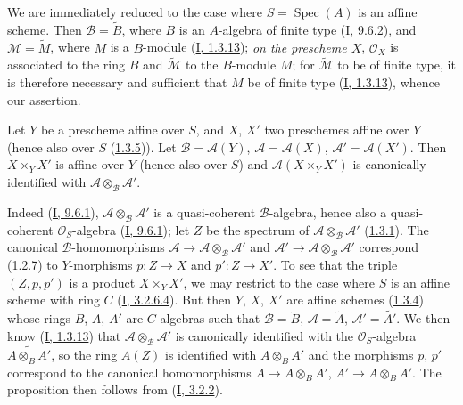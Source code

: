 We are immediately reduced to the case where $S=\operatorname{Spec}(A)$ is
an affine scheme. Then $\mathcal{B}=\widetilde{B}$, where $B$ is an
$A$-algebra of finite type (\hyperref[I.9.6.2]{I, 9.6.2}), and
$\mathcal{M}=\widetilde{M}$, where $M$ is a $B$-module
(\hyperref[I.1.3.13]{I, 1.3.13}); \emph{on the prescheme $X$},
$\mathcal{O}_X$ is associated to the ring $B$ and
$\widetilde{\mathcal{M}}$ to the $B$-module $M$; for
$\widetilde{\mathcal{M}}$ to be of finite type, it is therefore necessary
and sufficient that $M$ be of finite type
(\hyperref[I.1.3.13]{I, 1.3.13}), whence our assertion.

\begin{proposition}[1.4.6]
\label{II.1.4.6}
Let $Y$ be a prescheme affine over $S$, and $X$, $X'$ two preschemes
affine over $Y$ (hence also over $S$
(\hyperref[II.1.3.5]{1.3.5})). Let
$\mathcal{B}=\mathcal{A}(Y)$, $\mathcal{A}=\mathcal{A}(X)$,
$\mathcal{A}'=\mathcal{A}(X')$. Then $X\times_Y X'$ is affine over
$Y$ (hence also over $S$) and $\mathcal{A}(X\times_Y X')$
is canonically identified with $\mathcal{A}\otimes_{\mathcal{B}}\mathcal{A}'$.
\end{proposition}

Indeed (\hyperref[I.9.6.1]{I, 9.6.1}),
$\mathcal{A}\otimes_{\mathcal{B}}\mathcal{A}'$ is a quasi-coherent
$\mathcal{B}$-algebra, hence also a quasi-coherent
$\mathcal{O}_S$-algebra
(\hyperref[I.9.6.1]{I, 9.6.1}); let $Z$ be the spectrum of
$\mathcal{A}\otimes_{\mathcal{B}}\mathcal{A}'$
(\hyperref[II.1.3.1]{1.3.1}). The canonical $\mathcal{B}$-homomorphisms
$\mathcal{A}\to\mathcal{A}\otimes_{\mathcal{B}}\mathcal{A}'$ and
$\mathcal{A}'\to\mathcal{A}\otimes_{\mathcal{B}}\mathcal{A}'$ correspond
(\hyperref[II.1.2.7]{1.2.7}) to $Y$-morphisms $p:Z\to X$ and
$p':Z\to X'$. To see that the triple $(Z,p,p')$ is a product
$X\times_Y X'$, we may restrict to the case where $S$ is an affine scheme
with ring $C$ (\hyperref[I.3.2.6.4]{I, 3.2.6.4}). But then $Y$, $X$,
$X'$ are affine schemes (\hyperref[II.1.3.4]{1.3.4}) whose
rings $B$, $A$, $A'$ are $C$-algebras such that
$\mathcal{B}=\widetilde{B}$, $\mathcal{A}=\widetilde{A}$,
$\mathcal{A}'=\widetilde{A'}$. We then know
(\hyperref[I.1.3.13]{I, 1.3.13}) that
$\mathcal{A}\otimes_{\mathcal{B}}\mathcal{A}'$ is canonically identified
with the $\mathcal{O}_S$-algebra $\widetilde{A\otimes_B A'}$, so the ring
$A(Z)$ is identified with $A\otimes_B A'$ and the morphisms $p$, $p'$
correspond to the canonical homomorphisms $A\to A\otimes_B A'$,
$A'\to A\otimes_B A'$. The proposition then follows from
(\hyperref[I.3.2.2]{I, 3.2.2}).


